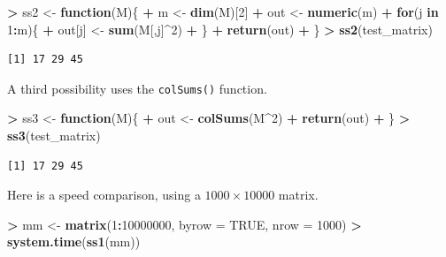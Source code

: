 \documentclass[]{krantz}
\makeatletter
\newenvironment{Shaded}{\begin{snugshade}}{\end{snugshade}}
\newcommand{\KeywordTok}[1]{\textcolor[rgb]{0.27,0.27,0.27}{\textbf{#1}}}
\newcommand{\DataTypeTok}[1]{\textcolor[rgb]{0.27,0.27,0.27}{#1}}
\newcommand{\DecValTok}[1]{\textcolor[rgb]{0.06,0.06,0.06}{#1}}
\newcommand{\StringTok}[1]{\textcolor[rgb]{0.5,0.5,0.5}{#1}}
\newcommand{\OtherTok}[1]{\textcolor[rgb]{0.37,0.37,0.37}{#1}}
\newcommand{\ControlFlowTok}[1]{\textcolor[rgb]{0.27,0.27,0.27}{\textbf{#1}}}
\newcommand{\OperatorTok}[1]{\textcolor[rgb]{0.43,0.43,0.43}{\textbf{#1}}}
\newcommand{\NormalTok}[1]{#1}
\newenvironment{kframe}{%
\medskip{}
\setlength{\fboxsep}{.8em}
 \def\at@end@of@kframe{}%
 \ifinner\ifhmode%
  \def\at@end@of@kframe{\end{minipage}}%
  \begin{minipage}{\columnwidth}%
 \fi\fi%
 \def\FrameCommand##1{\hskip\@totalleftmargin \hskip-\fboxsep
 \colorbox{shadecolor}{##1}\hskip-\fboxsep
     \hskip-\linewidth \hskip-\@totalleftmargin \hskip\columnwidth}%
 \MakeFramed {\advance\hsize-\width
   \@totalleftmargin\z@ \linewidth\hsize
   \@setminipage}}%
 {\par\unskip\endMakeFramed%
 \at@end@of@kframe}
\renewenvironment{Shaded}{\begin{kframe}}{\end{kframe}}
\makeatother
\begin{document}
\begin{Shaded}
\begin{Highlighting}[]
\OperatorTok{>}\StringTok{ }\NormalTok{ss2 <-}\StringTok{ }\ControlFlowTok{function}\NormalTok{(M)\{}
\OperatorTok{+}\StringTok{     }\NormalTok{m <-}\StringTok{ }\KeywordTok{dim}\NormalTok{(M)[}\DecValTok{2}\NormalTok{]}
\OperatorTok{+}\StringTok{     }\NormalTok{out <-}\StringTok{ }\KeywordTok{numeric}\NormalTok{(m)}
\OperatorTok{+}\StringTok{     }\ControlFlowTok{for}\NormalTok{(j }\ControlFlowTok{in} \DecValTok{1}\OperatorTok{:}\NormalTok{m)\{}
\OperatorTok{+}\StringTok{         }\NormalTok{out[j] <-}\StringTok{ }\KeywordTok{sum}\NormalTok{(M[,j]}\OperatorTok{^}\DecValTok{2}\NormalTok{)}
\OperatorTok{+}\StringTok{     }\NormalTok{\}}
\OperatorTok{+}\StringTok{     }\KeywordTok{return}\NormalTok{(out) }
\OperatorTok{+}\StringTok{ }\NormalTok{\}}
\OperatorTok{>}\StringTok{ }\KeywordTok{ss2}\NormalTok{(test_matrix)}
\end{Highlighting}
\end{Shaded}

\begin{verbatim}
[1] 17 29 45
\end{verbatim}

A third possibility uses the \texttt{colSums()} function.

\begin{Shaded}
\begin{Highlighting}[]
\OperatorTok{>}\StringTok{ }\NormalTok{ss3 <-}\StringTok{ }\ControlFlowTok{function}\NormalTok{(M)\{}
\OperatorTok{+}\StringTok{     }\NormalTok{out <-}\StringTok{ }\KeywordTok{colSums}\NormalTok{(M}\OperatorTok{^}\DecValTok{2}\NormalTok{)}
\OperatorTok{+}\StringTok{     }\KeywordTok{return}\NormalTok{(out)}
\OperatorTok{+}\StringTok{ }\NormalTok{\}}
\OperatorTok{>}\StringTok{ }\KeywordTok{ss3}\NormalTok{(test_matrix)}
\end{Highlighting}
\end{Shaded}

\begin{verbatim}
[1] 17 29 45
\end{verbatim}

Here is a speed comparison, using a \(1000\times 10000\) matrix.

\begin{Shaded}
\begin{Highlighting}[]
\OperatorTok{>}\StringTok{ }\NormalTok{mm <-}\StringTok{ }\KeywordTok{matrix}\NormalTok{(}\DecValTok{1}\OperatorTok{:}\DecValTok{10000000}\NormalTok{, }\DataTypeTok{byrow =} \OtherTok{TRUE}\NormalTok{, }\DataTypeTok{nrow =} \DecValTok{1000}\NormalTok{)}
\OperatorTok{>}\StringTok{ }\KeywordTok{system.time}\NormalTok{(}\KeywordTok{ss1}\NormalTok{(mm))}
\end{Highlighting}
\end{Shaded}
\end{document}
